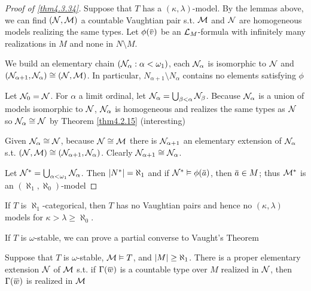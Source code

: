 \documentclass[11pt]{article}
\begin{document}
\begin{proof}[Proof of \ref{thm4.3.34}]
Suppose that \(T\) has a \((\kappa,\lambda)\)-model. By the lemmas above, we can find \((\mathcal{N},\mathcal{M})\) a countable
Vaughtian pair s.t. \(\mathcal{M}\) and \(\mathcal{N}\) are homogeneous models realizing the same types.
Let \(\phi(\barv)\) be an \(\mathcal{L}_M\)-formula with infinitely many realizations in \(M\) and none
in \(N\setminus M\).

We build an elementary chain \((\mathcal{N}_\alpha:\alpha<\omega_1)\), each \(\mathcal{N}_\alpha\) is isomorphic to \(\mathcal{N}\)
and \((\mathcal{N}_{\alpha+1},\mathcal{N}_\alpha)\cong(\mathcal{N},\mathcal{M})\). In particular, \(N_{\alpha+1}\setminus N_\alpha\) contains no elements satisfying
\(\phi\)

Let \(\mathcal{N}_0=\mathcal{N}\). For \(\alpha\) a limit ordinal, let \(\mathcal{N}_\alpha=\bigcup_{\beta<\alpha}\mathcal{N}_\beta\). Because \(\mathcal{N}_\alpha\) is a union of models
isomorphic to \(\mathcal{N}\), \(\mathcal{N}_\alpha\) is homogeneous and realizes the same types as \(\mathcal{N}\) so \(\mathcal{N}_\alpha\cong\mathcal{N}\) by
Theorem \ref{thm4.2.15} (interesting)

Given \(\mathcal{N}_\alpha\cong\mathcal{N}\), because \(\mathcal{N}\cong\mathcal{M}\) there is \(\mathcal{N}_{\alpha+1}\) an elementary extension of \(\mathcal{N}_\alpha\)
s.t. \((\mathcal{N},\mathcal{M})\cong(\mathcal{N}_{\alpha+1},\mathcal{N}_\alpha)\). Clearly \(\mathcal{N}_{\alpha+1}\cong\mathcal{N}_\alpha\). \label{Problem8}

Let \(\mathcal{N}^*=\bigcup_{\alpha<\omega_1}\mathcal{N}_\alpha\). Then \(\abs{N^*}=\aleph_1\) and if \(\caln^*\vDash\phi(\bara)\), then \(\bara\in M\);
thus \(\mathcal{M}^*\) is an \((\aleph_1,\aleph_0)\)-model
\end{proof}

\begin{corollary}[]
If \(T\) is \(\aleph_1\)-categorical, then \(T\) has no Vaughtian pairs and hence no \((\kappa,\lambda)\) models
for \(\kappa>\lambda\ge\aleph_0\).
\end{corollary}

If \(T\) is \(\omega\)-stable, we can prove a partial converse to Vaught's Theorem

\begin{lemma}[]
Suppose that \(T\) is \(\omega\)-stable, \(\mathcal{M}\vDash T\), and \(\abs{M}\ge\aleph_1\). There is a proper elementary
extension \(\mathcal{N}\) of \(\mathcal{M}\) s.t. if \(\Gamma(\barw)\) is a countable type over \(M\) realized in \(\mathcal{N}\),
then \(\Gamma(\barw)\) is realized in \(\mathcal{M}\)
\end{lemma}
\end{document}
